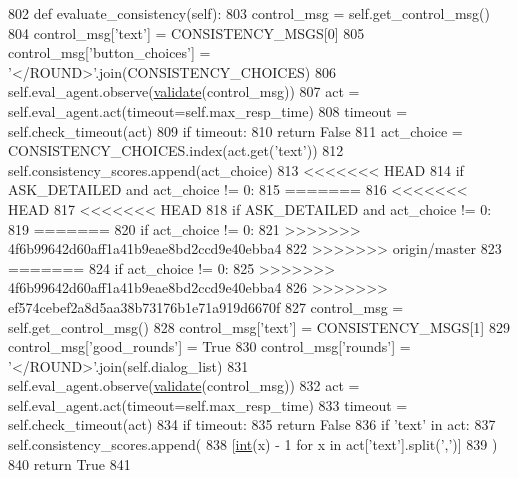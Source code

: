 \begin{DoxyCode}
802     \textcolor{keyword}{def }evaluate\_consistency(self):
803         control\_msg = self.get\_control\_msg()
804         control\_msg[\textcolor{stringliteral}{'text'}] = CONSISTENCY\_MSGS[0]
805         control\_msg[\textcolor{stringliteral}{'button\_choices'}] = \textcolor{stringliteral}{'</ROUND>'}.join(CONSISTENCY\_CHOICES)
806         self.eval\_agent.observe(\hyperlink{namespaceparlai_1_1core_1_1worlds_afc3fad603b7bce41dbdc9cdc04a9c794}{validate}(control\_msg))
807         act = self.eval\_agent.act(timeout=self.max\_resp\_time)
808         timeout = self.check\_timeout(act)
809         \textcolor{keywordflow}{if} timeout:
810             \textcolor{keywordflow}{return} \textcolor{keyword}{False}
811         act\_choice = CONSISTENCY\_CHOICES.index(act.get(\textcolor{stringliteral}{'text'}))
812         self.consistency\_scores.append(act\_choice)
813 <<<<<<< HEAD
814         \textcolor{keywordflow}{if} ASK\_DETAILED \textcolor{keywordflow}{and} act\_choice != 0:
815 =======
816 <<<<<<< HEAD
817 <<<<<<< HEAD
818         \textcolor{keywordflow}{if} ASK\_DETAILED \textcolor{keywordflow}{and} act\_choice != 0:
819 =======
820         \textcolor{keywordflow}{if} act\_choice != 0:
821 >>>>>>> 4f6b99642d60aff1a41b9eae8bd2ccd9e40ebba4
822 >>>>>>> origin/master
823 =======
824         \textcolor{keywordflow}{if} act\_choice != 0:
825 >>>>>>> 4f6b99642d60aff1a41b9eae8bd2ccd9e40ebba4
826 >>>>>>> ef574cebef2a8d5aa38b73176b1e71a919d6670f
827             control\_msg = self.get\_control\_msg()
828             control\_msg[\textcolor{stringliteral}{'text'}] = CONSISTENCY\_MSGS[1]
829             control\_msg[\textcolor{stringliteral}{'good\_rounds'}] = \textcolor{keyword}{True}
830             control\_msg[\textcolor{stringliteral}{'rounds'}] = \textcolor{stringliteral}{'</ROUND>'}.join(self.dialog\_list)
831             self.eval\_agent.observe(\hyperlink{namespaceparlai_1_1core_1_1worlds_afc3fad603b7bce41dbdc9cdc04a9c794}{validate}(control\_msg))
832             act = self.eval\_agent.act(timeout=self.max\_resp\_time)
833             timeout = self.check\_timeout(act)
834             \textcolor{keywordflow}{if} timeout:
835                 \textcolor{keywordflow}{return} \textcolor{keyword}{False}
836             \textcolor{keywordflow}{if} \textcolor{stringliteral}{'text'} \textcolor{keywordflow}{in} act:
837                 self.consistency\_scores.append(
838                     [\hyperlink{namespacelanguage__model_1_1eval__ppl_a7d12ee00479673c5c8d1f6d01faa272a}{int}(x) - 1 \textcolor{keywordflow}{for} x \textcolor{keywordflow}{in} act[\textcolor{stringliteral}{'text'}].split(\textcolor{stringliteral}{','})]
839                 )
840         \textcolor{keywordflow}{return} \textcolor{keyword}{True}
841 
\end{DoxyCode}
